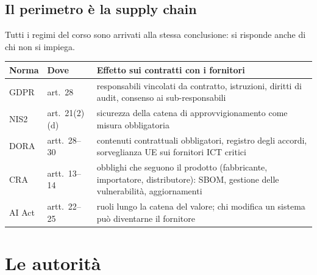 \subsection{Il perimetro è la supply chain}
Tutti i regimi del corso sono arrivati alla stessa conclusione: si risponde anche di chi non si impiega.
\begin{center}
\small
\begin{tabularx}{\linewidth}{>{\raggedright\arraybackslash}p{2cm} >{\raggedright\arraybackslash}p{2.4cm} X}
\toprule
\textbf{Norma} & \textbf{Dove} & \textbf{Effetto sui contratti con i fornitori}\\
\midrule
GDPR & art.~28 & responsabili vincolati da contratto, istruzioni, diritti di audit, consenso ai
  sub-responsabili\\
NIS2 & art.~21(2)(d) & sicurezza della catena di approvvigionamento come misura obbligatoria\\
DORA & artt.~28--30 & contenuti contrattuali obbligatori, registro degli accordi, sorveglianza UE sui
  fornitori ICT critici\\
CRA & artt.~13--14 & obblighi che seguono il prodotto (fabbricante, importatore, distributore): SBOM,
  gestione delle vulnerabilità, aggiornamenti\\
AI Act & artt.~22--25 & ruoli lungo la catena del valore; chi modifica un sistema può diventarne il
  fornitore\\
\bottomrule
\end{tabularx}
\end{center}

\section{Le autorità}
\label{sec:intro-autorita}

